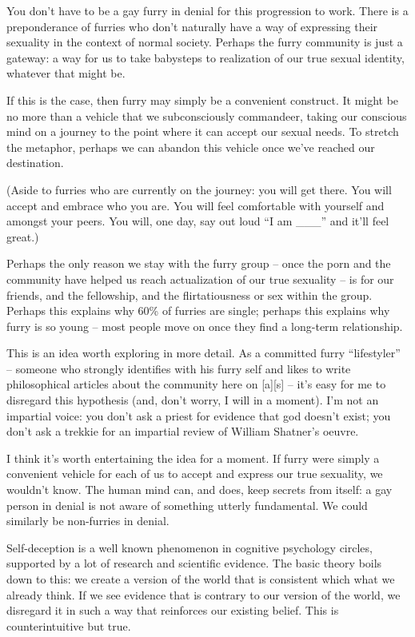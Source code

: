 You don’t have to be a gay furry in denial for this progression to work. There is a preponderance of furries who don’t naturally have a way of expressing their sexuality in the context of normal society. Perhaps the furry community is just a gateway: a way for us to take babysteps to realization of our true sexual identity, whatever that might be.

If this is the case, then furry may simply be a convenient construct. It might be no more than a vehicle that we subconsciously commandeer, taking our conscious mind on a journey to the point where it can accept our sexual needs. To stretch the metaphor, perhaps we can abandon this vehicle once we’ve reached our destination.

(Aside to furries who are currently on the journey: you will get there. You will accept and embrace who you are. You will feel comfortable with yourself and amongst your peers. You will, one day, say out loud ``I am \_\_\_'' and it’ll feel great.)

Perhaps the only reason we stay with the furry group -- once the porn and the community have helped us reach actualization of our true sexuality -- is for our friends, and the fellowship, and the flirtatiousness or sex within the group. Perhaps this explains why 60\% of furries are single; perhaps this explains why furry is so young -- most people move on once they find a long-term relationship.

This is an idea worth exploring in more detail. As a committed furry ``lifestyler'' -- someone who strongly identifies with his furry self and likes to write philosophical articles about the community here on [a][s] -- it’s easy for me to disregard this hypothesis (and, don’t worry, I will in a moment). I’m not an impartial voice: you don’t ask a priest for evidence that god doesn’t exist; you don’t ask a trekkie for an impartial review of William Shatner’s oeuvre.

I think it’s worth entertaining the idea for a moment. If furry were simply a convenient vehicle for each of us to accept and express our true sexuality, we wouldn’t know. The human mind can, and does, keep secrets from itself: a gay person in denial is not aware of something utterly fundamental. We could similarly be non-furries in denial.

Self-deception is a well known phenomenon in cognitive psychology circles, supported by a lot of research and scientific evidence. The basic theory boils down to this: we create a version of the world that is consistent which what we already think. If we see evidence that is contrary to our version of the world, we disregard it in such a way that reinforces our existing belief. This is counterintuitive but true.

